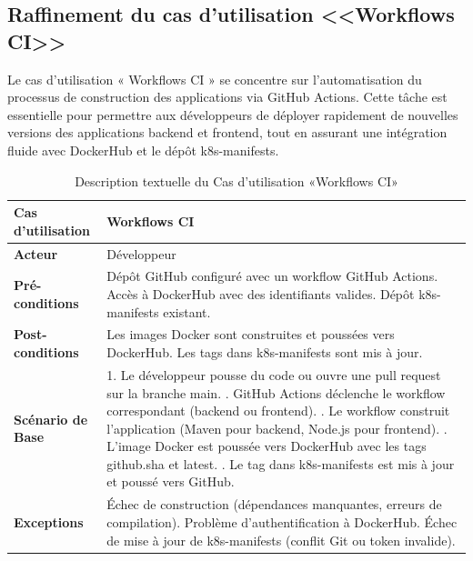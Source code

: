   \subsection{Raffinement du cas d'utilisation <<Workflows CI>>}
  Le cas d’utilisation « Workflows CI » se concentre sur l’automatisation du processus de construction des applications via GitHub Actions. Cette tâche est essentielle pour permettre aux développeurs de déployer rapidement de nouvelles versions des applications backend et frontend, tout en assurant une intégration fluide avec DockerHub et le dépôt k8s-manifests.
  \newpage
  \begin{table}[!ht]
      \centering
      \caption{Description textuelle du Cas d’utilisation «Workflows CI»}
      \label{tab:workflows_ci}
      \renewcommand{\arraystretch}{1.2}
      \begin{tabular}{|p{4.2cm}|p{11cm}|}
      \hline
      \textbf{Cas d'utilisation} & Workflows CI \\
      \hline
      \textbf{Acteur} & Développeur \\
      \hline
      \textbf{Pré-conditions} & Dépôt GitHub configuré avec un workflow GitHub Actions. \newline Accès à DockerHub avec des identifiants valides. \newline Dépôt k8s-manifests existant. \\
      \hline
      \textbf{Post-conditions} & Les images Docker sont construites et poussées vers DockerHub. \newline Les tags dans k8s-manifests sont mis à jour. \\
      \hline
      \textbf{Scénario de Base} & 
      1. Le développeur pousse du code ou ouvre une pull request sur la branche main. \newline
      2. GitHub Actions déclenche le workflow correspondant (backend ou frontend). \newline
      3. Le workflow construit l’application (Maven pour backend, Node.js pour frontend). \newline
      4. L’image Docker est poussée vers DockerHub avec les tags github.sha et latest. \newline
      5. Le tag dans k8s-manifests est mis à jour et poussé vers GitHub. \\
      \hline
      \textbf{Exceptions} & 
      Échec de construction (dépendances manquantes, erreurs de compilation). \newline Problème d’authentification à DockerHub. \newline Échec de mise à jour de k8s-manifests (conflit Git ou token invalide). \\
      \hline
      \end{tabular}
  \end{table}
